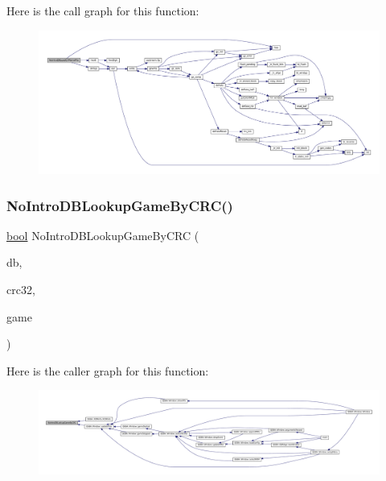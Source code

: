 Here is the call graph for this function\+:
\nopagebreak
\begin{figure}[H]
\begin{center}
\leavevmode
\includegraphics[width=350pt]{no-intro_8h_a0ce34503c62adbfd6accf09a9ce89260_cgraph}
\end{center}
\end{figure}
\mbox{\label{no-intro_8h_a8aa1074ddc85b995d2949c72e356f0d1}} 
\subsubsection{\texorpdfstring{No\+Intro\+D\+B\+Lookup\+Game\+By\+C\+R\+C()}{NoIntroDBLookupGameByCRC()}}
{\footnotesize\ttfamily \mbox{\hyperlink{libretro_8h_a4a26dcae73fb7e1528214a068aca317e}{bool}} No\+Intro\+D\+B\+Lookup\+Game\+By\+C\+RC (\begin{DoxyParamCaption}\item[{const struct No\+Intro\+DB $\ast$}]{db,  }\item[{uint32\+\_\+t}]{crc32,  }\item[{struct \mbox{\hyperlink{no-intro_8h_struct_no_intro_game}{No\+Intro\+Game}} $\ast$}]{game }\end{DoxyParamCaption})}

Here is the caller graph for this function\+:
\nopagebreak
\begin{figure}[H]
\begin{center}
\leavevmode
\includegraphics[width=350pt]{no-intro_8h_a8aa1074ddc85b995d2949c72e356f0d1_icgraph}
\end{center}
\end{figure}
